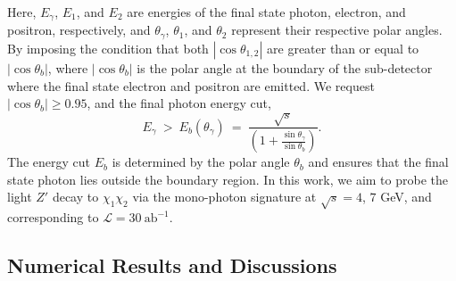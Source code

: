 \documentclass[preprint, superscriptaddress,amsmath, nofootinbib]{revtex4-1}
\begin{document}
Here, $E_{\gamma}$, $E_{1}$, and $E_{2}$ are energies of the final state photon, electron, and positron, respectively, and $\theta_{\gamma}$, $\theta_{1}$, and $\theta_{2}$ represent their respective polar angles. By imposing the condition that both $|\cos{\theta_{1,2}}|$ are greater than or equal to $|\cos{\theta_{b}}|$, where $|\cos{\theta_{b}}|$ is the polar angle at the boundary of the sub-detector where the final state electron and positron are emitted. We request $|\cos{\theta_{b}}| \geq 0.95$, and the final photon energy cut,
\begin{equation}
    E_{\gamma} \ > \ E_{b}(\theta_{\gamma}) \ = \ \frac{\sqrt{s}}{(1+\frac{\sin{\theta_{\gamma}}}{\sin{\theta_{b}}
    })}. 
\end{equation}
The energy cut $E_{b}$ is determined by the polar angle $\theta_{b}$ and ensures that the final state photon lies outside the boundary region. In this work, we aim to probe the light $Z'$ decay to $\chi_1\chi_2$ via the mono-photon signature at $\sqrt{s} = 4$, $7$ GeV, 
and corresponding to $\mathcal{L} = 30~\text{ab}^{-1}$.

\subsection{Numerical Results and Discussions} 
\label{sec:result}


\end{document}

